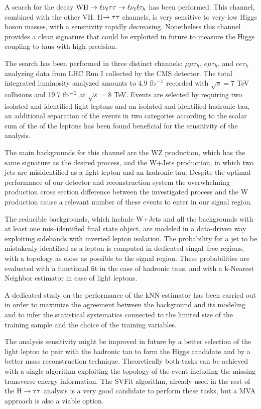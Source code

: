 A search for the decay $\mathrm{W}\mathrm{H}\rightarrow\ell\nu_\ell\tau\tau \rightarrow \ell \nu_\ell \ell \tau_h$ has been performed. This channel, combined with the other VH, H$\rightarrow\tau\tau$ channels, is very sensitive to very-low Higgs boson masses, with a sensitivity rapidly decreasing. Nonetheless this channel provides a clean signature that could be exploited in future to measure the Higgs coupling to taus with high precision. 

The search has been performed in three distinct channels: $\mu\mu\tau_h$, $e\mu\tau_h$, and $ee\tau_h$ analyzing data from LHC Run I collected by the CMS detector. The total integrated luminosity analyzed amounts to 4.9 fb$^{-1}$ recorded with $\sqrt{s} = 7$ TeV collisions and 19.7 fb$^{-1}$ at $\sqrt{s} = 8$ TeV. Events are selected by requiring two isolated and identified light leptons and an isolated and identified hadronic tau, an additional separation of the events in two categories according to the scalar sum of the \pT of the leptons has been found beneficial for the sensitivity of the analysis. 

The main backgrounds for this channel are the WZ production, which has the same signature as the desired process, and the W+Jets production, in which two jets are misidentified as a light lepton and an hadronic tau. Despite the optimal performance of our detector and reconstruction system the overwhelming production cross section difference between the investigated process and the W production cause a relevant number of these events to enter in our signal region.

The reducible backgrounds, which include W+Jets and all the backgrounds with at least one mis--identified final state object, are modeled in a data-driven way exploiting sidebands with inverted lepton isolation. The probability for a jet to be mistakenly identified as a lepton is computed in dedicated singal--free regions, with a topology as close as possible to the signal region. These probabilities are evaluated with a functional fit in the case of hadronic taus, and with a k-Nearest Neighbor estimator in case of light leptons. 

A dedicated study on the performance of the kNN estimator has been carried out in order to maximize the agreement between the background and its modeling and to infer the statistical systematics connected to the limited size of the training sample and the choice of the training variables.

The analysis sensitivity might be improved in future by a better selection of the light lepton to pair with the hadronic tau to form the Higgs candidate and by a better mass reconstruction technique. Theoretically both tasks can be achieved with a single algorithm exploiting the topology of the event including the missing transverse energy information. The SVFit algorithm, already used in the rest of the $\mathrm{H} \rightarrow \tau\tau$ analysis is a very good candidate to perform these tasks, but a MVA approach is also a viable option.

